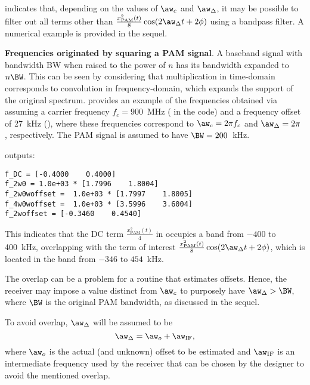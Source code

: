  indicates that, depending on the values of $\aw_c$ and $\aw_{\Delta}$, it may be possible to filter out all terms other than $\frac{x^2_\textrm{PAM}(t)}{8} \cos(2\aw_{\Delta} t + 2\phi)$ using a bandpass filter. A numerical example is provided in the sequel.

\bExample \textbf{Frequencies originated by squaring a PAM signal}.
A baseband signal with bandwidth BW when raised to the power of $n$ has its bandwidth expanded to $n \BW$. This can be seen by considering that multiplication in time-domain corresponds to convolution in frequency-domain, which expands the support of the original spectrum.
 provides an example of the frequencies obtained via  assuming a carrier frequency $f_c=900$~MHz ( in the code) and a frequency offset of 27~kHz (), where these frequencies correspond to $\aw_c=2 \pi f_c$ and $\aw_{\Delta} = 2 \pi$ , respectively. The PAM signal is assumed to have $\BW=200$~kHz.


 outputs:
\begin{verbatim}
f_DC = [-0.4000    0.4000]
f_2w0 = 1.0e+03 * [1.7996    1.8004]
f_2w0woffset =  1.0e+03 * [1.7997    1.8005]
f_4w0woffset =  1.0e+03 * [3.5996    3.6004]
f_2woffset = [-0.3460    0.4540]
\end{verbatim}
This indicates that the DC term
$\frac{x^2_\textrm{PAM}(t)}{4}$ in  occupies a band from $-400$ to 400~kHz, overlapping with the term of interest $\frac{x^2_\textrm{PAM}(t)}{8} \cos(2\aw_{\Delta} t + 2\phi)$, which is located in the band from $-346$ to $454$~kHz. 

The overlap can be a problem for a routine that estimates offsets. Hence, the receiver may impose a value distinct from $\aw_c$ to purposely have
$\aw_{\Delta} > \BW$, where $\BW$ is the original PAM bandwidth, as discussed in the sequel.
\eExample

To avoid overlap, $\aw_{\Delta}$ will be assumed to be
\begin{equation}
\aw_{\Delta} = \aw_o + \aw_{\textrm{IF}},
\label{eq:syncViaIF}
\end{equation}
where $\aw_o$ is the actual (and unknown) offset to be estimated and $\aw_{\textrm{IF}}$ is
an intermediate frequency used by the receiver that can be chosen by the designer to avoid the mentioned overlap.

